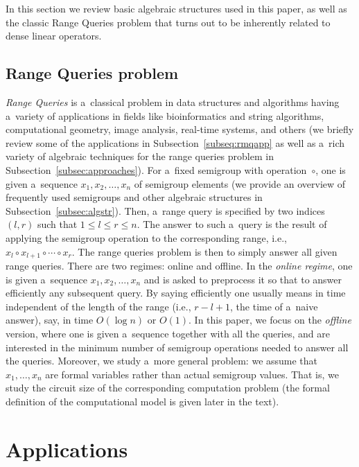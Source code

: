 \documentclass[11pt,letterpaper]{article}
\begin{document}
In this section we review basic algebraic structures used in this paper, as well
as the classic Range Queries problem that turns out to be inherently related to
dense linear operators.



\subsection{Range Queries problem}

{\em Range Queries} is a~classical problem in data structures and algorithms
having a~variety of applications in fields like bioinformatics and string
algorithms, computational geometry, image analysis, real-time systems, and
others (we briefly review some of the applications in Subsection~\ref{subseq:rmqapp} as well as a~rich variety of algebraic techniques for the range queries problem in Subsection~\ref{subsec:approaches}). For a~fixed semigroup with operation~$\circ$, one is given a~sequence $x_1, x_2, \dotsc, x_n$ of semigroup elements (we provide an overview of frequently used semigroups and other algebraic structures in Subsection~\ref{subsec:algstr}). Then, a~range query is specified by two indices $(l,r)$ such that $1 \le l \le r \le n$. The answer to such a~query is the result of applying the semigroup operation to the corresponding range, i.e., $x_l \circ x_{l+1} \circ \dotsb \circ x_r$. The range queries problem is then to simply answer all given range queries. There are two regimes: online and offline. In the {\em online regime}, one is given a~sequence $x_1, x_2, \dotsc, x_n$ and is asked to preprocess it so that to answer efficiently any subsequent query. By saying efficiently one usually means in time independent of the length of the range (i.e., $r-l+1$, the time of a~naive answer), say, in time $O(\log n)$ or $O(1)$. In this paper, we focus on the {\em offline} version, where one is given a~sequence together with all the queries, and are interested in the minimum number of semigroup operations needed to answer all the queries. Moreover, we study a~more general problem: we assume that $x_1, \dotsc, x_n$ are formal variables rather than actual semigroup values. That is, we study the circuit size of the corresponding computation problem (the formal definition of the computational model is given later in the text).

\section{Applications}\label{sec-applications}
\end{document}
